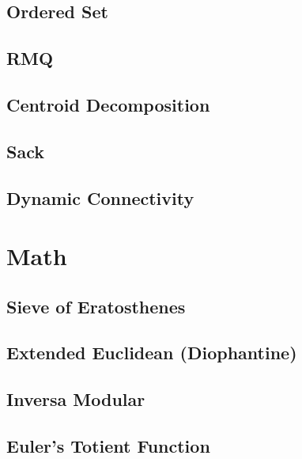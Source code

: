\subsection{Ordered Set}
\raggedbottom
\hrulefill
\subsection{RMQ}
\raggedbottom
\hrulefill
\subsection{Centroid Decomposition}
\raggedbottom
\hrulefill
\subsection{Sack}
\raggedbottom
\hrulefill
\subsection{Dynamic Connectivity}
\raggedbottom
\hrulefill

\section{Math}
\subsection{Sieve of Eratosthenes}
\raggedbottom
\hrulefill
\subsection{Extended Euclidean (Diophantine)}
\raggedbottom
\hrulefill
\subsection{Inversa Modular}
\raggedbottom
\hrulefill
\subsection{Euler’s Totient Function}
\raggedbottom
\hrulefill
